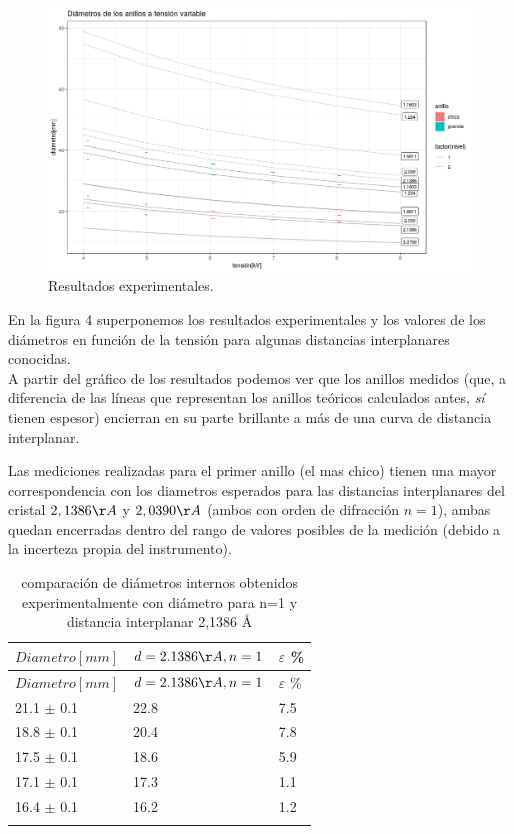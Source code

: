 \documentclass[]{article}
\begin{document}
\begin{figure}[H]
\centering
\includegraphics{resultados_experimentales.png}
\caption{Resultados experimentales.}
\end{figure}

En la figura 4 superponemos los resultados experimentales y los valores
de los diámetros en función de la tensión para algunas distancias
interplanares conocidas.\\
A partir del gráfico de los resultados podemos ver que los anillos
medidos (que, a diferencia de las líneas que representan los anillos
teóricos calculados antes, \emph{sí} tienen espesor) encierran en su
parte brillante a más de una curva de distancia interplanar.

Las mediciones realizadas para el primer anillo (el mas chico) tienen una mayor 
correspondencia con los diametros esperados para las distancias 
interplanares del cristal \(2,1386 \AA\) y \(2,0390 \AA\) (ambos con
orden de difracción $n=1$), ambas quedan encerradas dentro del rango de 
valores posibles de la medición (debido a la incerteza propia del instrumento).

\begin{longtable}[]{@{}lll@{}}
\toprule
\(Diametro[mm]\) & \(d=2.1386 \AA, n=1\) & \(\varepsilon\)
\%\tabularnewline
\midrule
\endfirsthead
\toprule
\(Diametro[mm]\) & \(d=2.1386 \AA, n=1\) & \(\varepsilon\)
\%\tabularnewline
\midrule
\endhead
21.1 \(\pm\) 0.1 & 22.8 & 7.5\tabularnewline
18.8 \(\pm\) 0.1 & 20.4 & 7.8\tabularnewline
17.5 \(\pm\) 0.1 & 18.6 & 5.9\tabularnewline
17.1 \(\pm\) 0.1 & 17.3 & 1.1\tabularnewline
16.4 \(\pm\) 0.1 & 16.2 & 1.2\tabularnewline
\bottomrule
\caption{comparación de diámetros internos obtenidos experimentalmente
con diámetro para n=1 y distancia interplanar 2,1386 \AA}\tabularnewline
\end{longtable}
\end{document}
